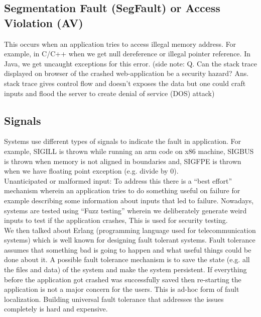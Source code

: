 \documentclass[twoside]{article}
\begin{document}
\subsection{Segmentation Fault (SegFault) or Access Violation (AV)}
This occurs when an application tries to access illegal memory address. For example, in C/C++ when we get null dereference or illegal pointer reference. In Java, we get uncaught exceptions for this error. (side note: Q. Can the stack trace displayed on browser of the crashed web-application be a security hazard? Ans. stack trace gives control flow and doesn’t exposes the data but one could craft inputs and flood the server to create denial of service (DOS) attack)
\subsection{Signals}
Systems use different types of signals to indicate the fault in application. For example,  SIGILL is thrown while running an arm code on x86 machine, SIGBUS is thrown when memory is not aligned in boundaries and, SIGFPE is thrown when we have floating point exception (e.g. divide by 0). \\
Unanticipated or malformed input: To address this there is a “best effort” mechanism wherein an application tries to do something useful on failure for example describing some information about inputs that led to failure. Nowadays,  systems are tested using “Fuzz testing” wherein we deliberately generate weird inputs to test if the application crashes, This is used for security testing.
\\
We then talked about Erlang (programming language used for telecommunication systems)  which is well known for designing fault tolerant systems. Fault tolerance assumes that something bad is going to happen and what useful things could be done about it. A possible fault tolerance mechanism is to save  the state (e.g. all the files and data) of the system and make the system persistent. If everything before the application got crashed was successfully saved then re-starting the application is not a major concern for the users. This is  ad-hoc form of fault localization. Building universal fault tolerance that addresses the issues completely is hard and expensive. 
\end{document}
